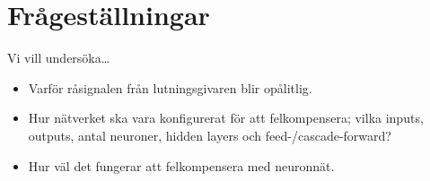 
\section{Frågeställningar}
Vi vill undersöka\ldots
\begin{itemize}
	\item Varför råsignalen från lutningsgivaren blir opålitlig.
	\item Hur nätverket ska vara konfigurerat för att felkompensera; vilka inputs,
		outputs, antal neuroner, hidden layers och feed-/cascade-forward?
	\item Hur väl det fungerar att felkompensera med neuronnät.
\end{itemize}
